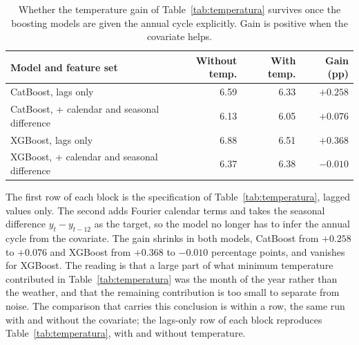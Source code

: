 \begin{table}[htbp]
\centering
\small
\setlength{\tabcolsep}{5pt}
\caption{Whether the temperature gain of Table~\ref{tab:temperatura} survives once the
boosting models are given the annual cycle explicitly. Gain is positive when the covariate
helps.}
\label{tab:tempdiffcal}
\begin{tabular}{lrrr}
\toprule
Model and feature set & Without temp. & With temp. & Gain (pp) \\
\midrule
CatBoost, lags only & 6.59 & 6.33 & $+0.258$ \\
CatBoost, + calendar and seasonal difference & 6.13 & 6.05 & $+0.076$ \\
\midrule
XGBoost, lags only & 6.88 & 6.51 & $+0.368$ \\
XGBoost, + calendar and seasonal difference & 6.37 & 6.38 & $-0.010$ \\
\bottomrule
\end{tabular}

\vspace{0.5em}
\begin{minipage}{\textwidth}
\footnotesize
The first row of each block is the specification of Table~\ref{tab:temperatura}, lagged
values only. The second adds Fourier calendar terms and takes the seasonal difference
$y_t - y_{t-12}$ as the target, so the model no longer has to infer the annual cycle from
the covariate. The gain shrinks in both models, CatBoost from $+0.258$ to $+0.076$ and XGBoost from $+0.368$ to $-0.010$ percentage
points, and vanishes for XGBoost. The reading is that a large part of what minimum
temperature contributed in Table~\ref{tab:temperatura} was the month of the year rather
than the weather, and that the remaining contribution is too small to separate from noise.
The comparison that carries this conclusion is within a row, the same run with and without
the covariate; the lags-only row of each block reproduces Table~\ref{tab:temperatura},
with and without temperature.
\end{minipage}
\end{table}